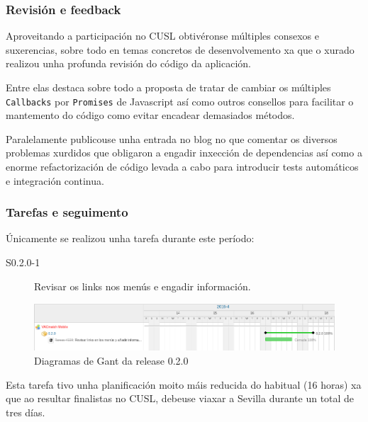       \subsubsection{Revisión e feedback}
      Aproveitando a participación no CUSL obtivéronse múltiples consexos e 
suxerencias, sobre todo en temas concretos de desenvolvemento xa que o xurado 
realizou unha profunda revisión do código da aplicación.

      Entre elas destaca sobre todo a proposta de tratar de cambiar os 
múltiples \lstinline{Callbacks} por \lstinline{Promises} de Javascript así como 
outros consellos para facilitar o mantemento do código como evitar encadear 
demasiados métodos.

      Paralelamente publicouse unha entrada no blog no que comentar os diversos 
problemas xurdidos que obligaron a engadir inxección de dependencias así como a 
enorme refactorización de código levada a cabo para introducir tests 
automáticos e integración continua.

      \subsubsection{Tarefas e seguimento}

      Únicamente se realizou unha tarefa durante este período:

        \begin{description}
          \item [S0.2.0-1] Revisar os links nos menús e engadir información.
        \end{description}

        \begin{figure}[h!]
          \begin{center}
          \includegraphics[width=\textwidth]{./img/gant_diagrams/020.png}
          \caption{Diagramas de Gant da release 0.2.0}
          \label{fig:gant20}
          \end{center}
        \end{figure}

     Esta tarefa tivo unha planificación moito máis reducida do habitual (16 
horas) xa que ao resultar finalistas no CUSL, debeuse viaxar a Sevilla durante 
un total de tres días.

